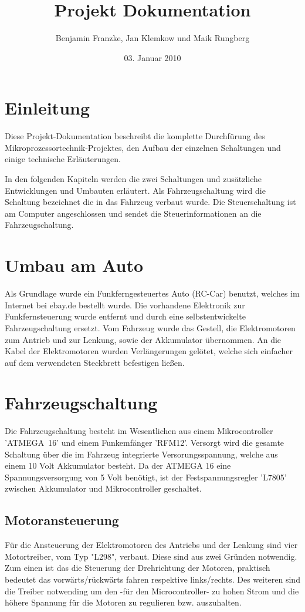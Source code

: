 \documentclass{scrartcl}
\title{Projekt Dokumentation}
\author{Benjamin Franzke, Jan Klemkow und Maik Rungberg}
\date{03. Januar 2010}
\begin{document}
\maketitle
\tableofcontents

\newpage

\section{Einleitung}
	Diese Projekt-Dokumentation beschreibt die komplette Durchfürung des Mikroprozessortechnik-Projektes,
	den Aufbau der einzelnen Schaltungen und einige technische Erläuterungen.

	In den folgenden Kapiteln werden die zwei Schaltungen und zusätzliche Entwicklungen und Umbauten erläutert.
	Als Fahrzeugschaltung wird die Schaltung bezeichnet die in das Fahrzeug verbaut wurde.
	Die Steuerschaltung ist am Computer angeschlossen und sendet die Steuerinformationen an die Fahrzeugschaltung.

\section{Umbau am Auto}
	Als Grundlage wurde ein Funkferngesteuertes Auto (RC-Car) benutzt,
	welches im Internet bei ebay.de bestellt wurde.
	Die vorhandene Elektronik zur Funkfernsteuerung wurde entfernt
	und durch eine selbstentwickelte Fahrzeugschaltung ersetzt.
	Vom Fahrzeug wurde das Gestell, die Elektromotoren zum Antrieb und zur Lenkung,
	sowie der Akkumulator übernommen.
	An die Kabel der Elektromotoren wurden Verlängerungen gelötet,
	welche sich einfacher auf dem verwendeten Steckbrett befestigen ließen.

\newpage

\section{Fahrzeugschaltung} %
	Die Fahrzeugschaltung besteht im Wesentlichen aus einem Mikrocontroller 'ATMEGA~16' und einem Funkemfänger 'RFM12'.
	Versorgt wird die gesamte Schaltung über die im Fahrzeug integrierte Versorungsspannung,
	welche aus einem 10 Volt Akkumulator besteht.
	Da der ATMEGA 16 eine Spannungsversorgung von 5 Volt benötigt, ist der Festspannungsregler 'L7805'
	zwischen Akkumulator und Mikrocontroller geschaltet.

	\subsection{Motoransteuerung}
		Für die Ansteuerung der Elektromotoren des Antriebs und der Lenkung sind vier Motortreiber, vom Typ "L298", verbaut.
		Diese sind aus zwei Gründen notwendig. Zum einen ist das die Steuerung der Drehrichtung der Motoren, praktisch
		bedeutet das vorwärts/rückwärts fahren respektive links/rechts.
		Des weiteren sind die Treiber notwending um den -für den Microcontroller- zu hohen Strom und die höhere Spannung
		für die Motoren zu regulieren bzw. auszuhalten.
\end{document}
